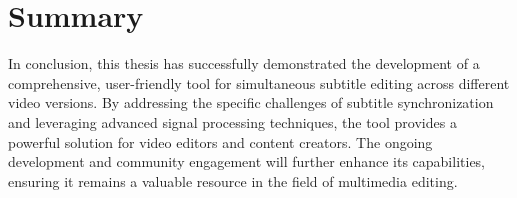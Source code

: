 \section{Summary}

In conclusion, this thesis has successfully demonstrated the development of a comprehensive, user-friendly tool for simultaneous subtitle editing across different video versions. By addressing the specific challenges of subtitle synchronization and leveraging advanced signal processing techniques, the tool provides a powerful solution for video editors and content creators. The ongoing development and community engagement will further enhance its capabilities, ensuring it remains a valuable resource in the field of multimedia editing.





% 